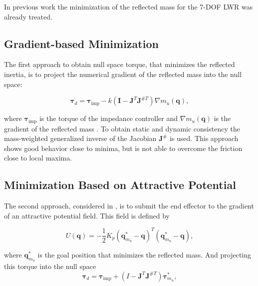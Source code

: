 In previous work \cite{paper_iros2017} the minimization of the reflected mass for the 7-DOF LWR was already treated.  
\subsection{Gradient-based  Minimization}
\label{subsec:gbm_7DOF}

The first approach to obtain null space torque, that minimizes the reflected inertia, is to project the numerical gradient of the reflected mass into the null space:
 
\begin{equation}
\mathbf{\tau}_d = \mathbf{\tau}_\mathrm{imp} - k (\mathbf{I} - \mathbf{J}^T \mathbf{J}^{\#T}) \nabla m_u(\mathbf{q}), \label{eq:gbm_nico}
\end{equation}

where $\mathbf{\tau}_\mathrm{imp}$ is the torque of the impedance controller and $\nabla m_u(\mathbf{q})$ is the gradient of the reflected mass \cite{paper_iros2017}. To obtain static and dynamic consistency \cite{khatib1995} the mass-weighted generalized inverse of the Jacobian $\mathbf{J}^{\#}$ is used.
This approach shows good behavior close to minima, but is not able to overcome the friction close to local maxima. 




\subsection{Minimization Based on Attractive Potential}
\label{subsec:minim_potential_intro}


The second approach, considered in \cite{paper_iros2017}, is to submit the end effector to the gradient of an attractive potential field. This field is defined by 


\begin{equation}
U(\mathbf{q}) = - \frac{1}{2} K_p (\mathbf{q}_{m_u}^\ast - \mathbf{q})^T (\mathbf{q}_{m_u}^\ast - \mathbf{q}), \label{eq:potential_intro}
\end{equation}

where $\mathbf{q}_{m_u}^\ast$ is the goal position that minimizes the reflected mass. And projecting this torque into the null space
\begin{equation}
\mathbf{\tau}_d = \mathbf{\tau}_\mathrm{imp} + (I - \mathbf{J}^T \mathbf{J}^{\#T}) \mathbf{\tau}_{m_u}^\ast, \label{eq:potential_controller_intro}
\end{equation}

